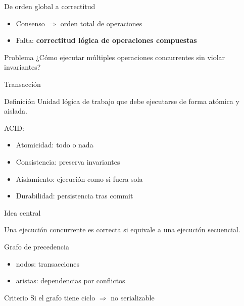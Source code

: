 \documentclass[institutional,screen,none]{ua-engineering-v6-beamer}
\title{\UACourse}
\subtitle{Clase 05 --- Serializabilidad, anomalías y 2PC/3PC}
\author{\UAProfessor}
\date{\UADate}
\begin{document}
{
\begin{frame}[plain]
\titlepage
\end{frame}
}


\begin{frame}{De orden global a correctitud}
\begin{itemize}
\item Consenso $\Rightarrow$ orden total de operaciones
\item Falta: \textbf{correctitud lógica de operaciones compuestas}
\end{itemize}

\pause
\begin{block}{Problema}
¿Cómo ejecutar múltiples operaciones concurrentes sin violar invariantes?
\end{block}
\end{frame}

\begin{frame}{Transacción}
\begin{block}{Definición}
Unidad lógica de trabajo que debe ejecutarse de forma atómica y aislada.
\end{block}

\pause
ACID:
\begin{itemize}
\item Atomicidad: todo o nada
\item Consistencia: preserva invariantes
\item Aislamiento: ejecución como si fuera sola
\item Durabilidad: persistencia tras commit
\end{itemize}
\end{frame}


\begin{frame}{Idea central}
\begin{block}{}
Una ejecución concurrente es correcta si equivale a una ejecución secuencial.
\end{block}
\end{frame}

\begin{frame}{Grafo de precedencia}
\begin{itemize}
\item nodos: transacciones
\item aristas: dependencias por conflictos
\end{itemize}

\pause
\begin{alertblock}{Criterio}
Si el grafo tiene ciclo $\Rightarrow$ no serializable
\end{alertblock}
\end{frame}
\end{document}
